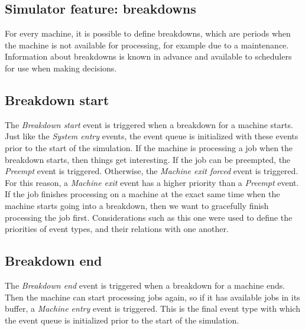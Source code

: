 \subsection{Simulator feature: breakdowns}
For every machine, it is possible to define breakdowns, which are periods when the machine is not available for processing, for example due to a maintenance. Information about breakdowns is known in advance and available to schedulers for use when making decisions.

\subsection{Breakdown start}
The \textit{Breakdown start} event is triggered when a breakdown for a machine starts. Just like the \textit{System entry} events, the event queue is initialized with these events prior to the start of the simulation. If the machine is processing a job when the breakdown starts, then things get interesting. If the job can be preempted, the \textit{Preempt} event is triggered. Otherwise, the \textit{Machine exit forced} event is triggered. For this reason, a \textit{Machine exit} event has a higher priority than a \textit{Preempt} event. If the job finishes processing on a machine at the exact same time when the machine starts going into a breakdown, then we want to gracefully finish processing the job first. Considerations such as this one were used to define the priorities of event types, and their relations with one another.

\subsection{Breakdown end}
The \textit{Breakdown end} event is triggered when a breakdown for a machine ends. Then the machine can start processing jobs again, so if it has available jobs in its buffer, a \textit{Machine entry} event is triggered. This is the final event type with which the event queue is initialized prior to the start of the simulation.

